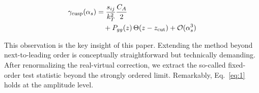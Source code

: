 \begin{align}
  \gamma_{\rm cusp}(\alpha_s) &= \frac{s_{ij}}{k_T^2} \frac{C_A}{2} \nonumber \\
  &\quad + P_{gg}(z) \, \Theta(z - z_{\rm cut}) + \mathcal{O}(\alpha_s^3) \label{eq:3}
\end{align}

This observation is the key insight of this paper. Extending the method
beyond next-to-leading order is conceptually straightforward but
technically demanding. After renormalizing the real-virtual correction,
we extract the so-called fixed-order test statistic beyond the strongly
ordered limit. Remarkably, Eq.~\eqref{eq:1} holds at the amplitude
level.

